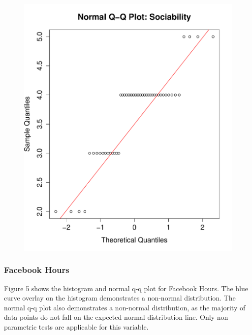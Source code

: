\begin{figure}[H]
\includegraphics[scale=0.35]{./img/qqplot_sociability.pdf}
\end{figure}

\subsubsection{Facebook Hours}

Figure 5 shows the histogram and normal q-q plot for Facebook Hours. The blue curve overlay on the histogram demonstrates a non-normal distribution. The normal q-q plot also demonstrates a non-normal distribution, as the majority of data-points do not fall on the expected normal distribution line. Only non-parametric tests are applicable for this variable.

